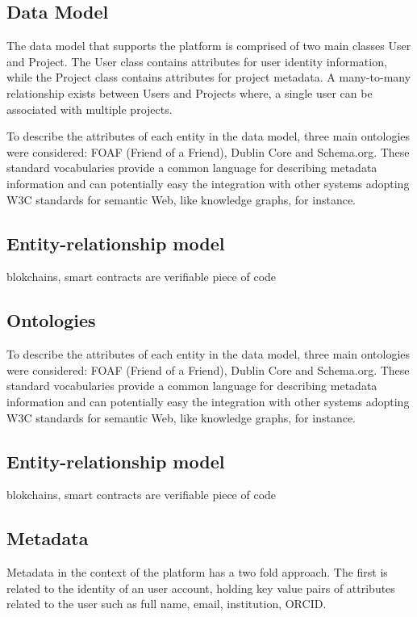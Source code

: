 \documentclass{article}
\begin{document}
\subsection{Data Model}

The data model that supports the platform is comprised of two main classes User and Project. The User class contains attributes for user identity information, while the Project class contains attributes for project metadata. A many-to-many relationship exists between Users and Projects where, a single user can be associated with multiple projects.

To describe the attributes of each entity in the data model, three main ontologies were considered: FOAF (Friend of a Friend), Dublin Core and Schema.org. These standard vocabularies provide a common language for describing metadata information and can potentially easy the integration with other systems adopting W3C standards for semantic Web, like knowledge graphs, for instance.

\subsection{Entity-relationship model}


blokchains, smart contracts are verifiable piece of code

\subsection{Ontologies}

To describe the attributes of each entity in the data model, three main ontologies were considered: FOAF (Friend of a Friend), Dublin Core and Schema.org. These standard vocabularies provide a common language for describing metadata information and can potentially easy the integration with other systems adopting W3C standards for semantic Web, like knowledge graphs, for instance.

\subsection{Entity-relationship model}


blokchains, smart contracts are verifiable piece of code


\subsection{Metadata}

Metadata in the context of the platform has a two fold approach. The first is related to the identity of an user account, holding key value pairs of attributes related to the user such as full name, email, institution, ORCID.
\end{document}

